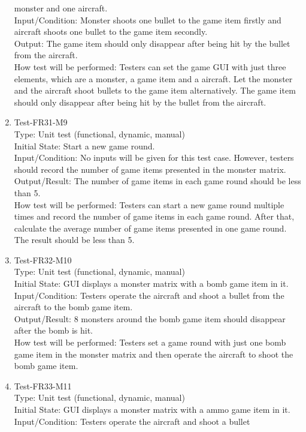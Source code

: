 \documentclass[12pt]{article}
\begin{document}
\begin{enumerate}[1.]
monster and one aircraft.\\
Input/Condition: Monster shoots one bullet to the game
item firstly and aircraft shoots one bullet to the game item 
secondly.\\
Output: The game item should only disappear after being 
hit by the bullet from the aircraft.\\
How test will be performed: Testers can set the game GUI
with just three elements, which are a monster, a game 
item and a aircraft. Let the monster and the aircraft 
shoot bullets to the game item alternatively. The 
game item should only disappear after being hit by the bullet 
from the aircraft.
\newpage
\item Test-FR31-M9\\ 
Type: Unit test (functional, dynamic, manual)\\
Initial State: Start a new game round.\\
Input/Condition: No inputs will be given 
for this test case. However, testers should record the
number of game items presented in the monster matrix.\\
Output/Result: The number of game items in each game round
should be less than 5.\\
How test will be performed: Testers can start a new game
round multiple times and record the number of game items
in each game round. After that, calculate the average
number of game items presented in one game round. The
result should be less than 5.
\item Test-FR32-M10\\
Type: Unit test (functional, dynamic, manual)\\
Initial State: GUI displays a monster matrix with a bomb
game item in it.\\
Input/Condition: Testers operate the aircraft and shoot a bullet
from the aircraft to the bomb game item.\\
Output/Result: 8 monsters around the bomb game item
should disappear 
after the bomb is hit.\\
How test will be performed: Testers set a game round
with just one bomb game item in the monster matrix and then operate
the aircraft to shoot the bomb game item.
\item Test-FR33-M11\\
Type: Unit test (functional, dynamic, manual)\\
Initial State: GUI displays a monster matrix with a ammo
game item in it.\\
Input/Condition: Testers operate the aircraft and shoot a bullet

\end{enumerate}
\end{document}
